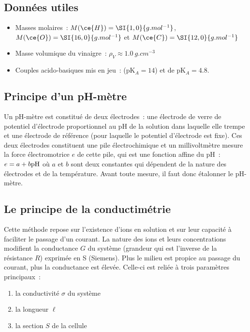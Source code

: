 \documentclass[a4paper, 10pt, final, garamond]{book}
\begin{document}
\subsection{Données utiles}

\begin{itemize}
    \item Masses molaires~: $M(\ce{H}) = \SI{1,0}{g.mol^{-1}}$, $M(\ce{O}) =
        \SI{16,0}{g.mol^{-1}}$ et $M(\ce{C}) = \SI{12,0}{g.mol^{-1}}$
    \item Masse volumique du vinaigre~: $\rho_V \approx \SI{1,0}{g.cm^{-3}}$
    \item Couples acido-basiques mis en jeu~:  (pK$_A = 14$) et
         de pK$_A = \num{4,8}$.
\end{itemize}

\subsection{Principe d'un pH-mètre}

Un pH-mètre est constitué de deux électrodes~: une électrode de verre de
potentiel d'électrode proportionnel au pH de la solution dans laquelle elle
trempe et une électrode de référence (pour laquelle le potentiel d'électrode est
fixe). Ces deux électrodes constituent une pile électrochimique et un
millivoltmètre mesure la force électromotrice $e$ de cette pile, qui est une
fonction affine du pH~: $e = a + b \rm pH$ où $a$ et $b$ sont deux constantes
qui dépendent de la nature des électrodes et de la température.  Avant toute
mesure, il faut donc étalonner le pH-mètre.

\subsection{Le principe de la conductimétrie}

Cette méthode repose sur l'existence d'ions en solution et sur leur capacité à
faciliter le passage d'un courant. La nature des ions et leurs concentrations
modifient la conductance $G$ du système (grandeur qui est l'inverse de la
résistance $R$) exprimée en \si{S} (Siemens). Plus le milieu est propice au
passage du courant, plus la conductance est élevée. Celle-ci est reliée à trois
paramètres principaux~:

\begin{enumerate}
    \item la conductivité $\sigma$ du système
    \item la longueur $\ell$
    \item la section $S$ de la cellule
\end{enumerate}
\end{document}
